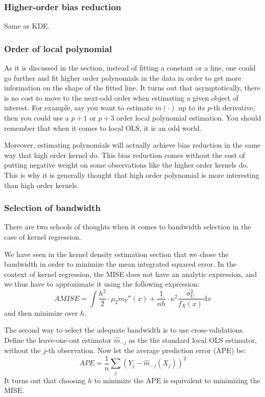 \documentclass[12pt]{report}
\def\D{\mathrm{d}}
\def\D{\mathrm{d}}
\def\D{\mathrm{d}}
\begin{document}
\subsubsection{Higher-order bias reduction}

Same as KDE.

\subsubsection{Order of local polynomial}

As it is discussed in the section, instead of fitting a constant or a line, one could go further and fit higher order polynomials in the data in order to get more information on the shape of the fitted line. It turns out that asymptotically, there is no cost to move to the next-odd order when estimating a given object of interest. For example, say you want to estimate $m(\cdot)$ up to its $p$-th derivative, then you could use a $p+1$ or $p+3$ order local polynomial estimation. You should remember that when it comes to local OLS, it is an odd world.

Moreover, estimating polynomials will actually achieve bias reduction in the same way that high order kernel do. This bias reduction comes without the cost of putting negative weight on some observations like the higher order kernels do. This is why it is generally thought that high order polynomial is more interesting than high order kernels.

\subsubsection{Selection of bandwidth}

There are two schools of thoughts when it comes to bandwidth selection in the case of kernel regression.

We have seen in the kernel density estimation section that we chose the bandwidth in order to minimize the mean integrated squared error. In the context of kernel regression, the MISE does not have an analytic expression, and we thus have to approximate it using the following expression: $$ AMISE = \int \frac{h^2}{2} \cdot \mu_2 m_Y''(x) + \frac{1}{nh}\cdot\kappa^2\frac{\sigma_U^2}{f_X(x)} \D x $$ and then minimize over $h$.

The second way to select the adequate bandwidth is to use cross-validations. Define the leave-one-out estimator $\hat m_{-j}$ as the the standard local OLS estimator, without the $j$-th observation. Now let the average prediction error (APE) be: $$APE = \frac{1}{n} \sum_j (Y_j - \hat m_{-j}(X_j))^2 $$ It turns out that choosing $h$ to minimize the APE is equivalent to minimizing the MISE.
\end{document}
